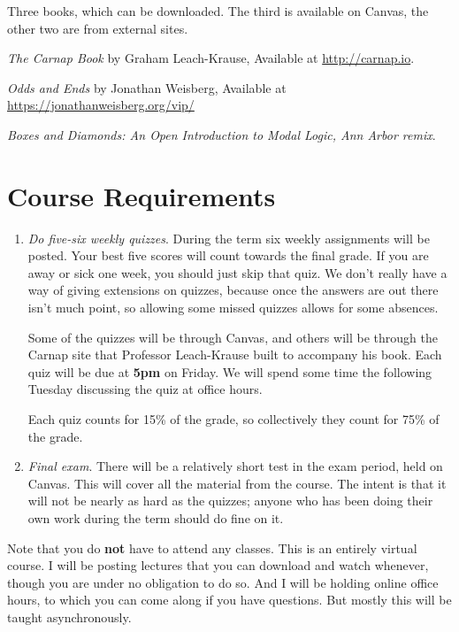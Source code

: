 \documentclass[10pt]{article}
\begin{document}
Three books, which can be downloaded. The third is available on Canvas, the other two are from external sites.

\begin{itemize*}
\item \textit{The Carnap Book} by Graham Leach-Krause, Available at \url{http://carnap.io}.
\item \textit{Odds and Ends} by Jonathan Weisberg, Available at \url{https://jonathanweisberg.org/vip/}
\item \textit{Boxes and Diamonds: An Open Introduction to Modal Logic, Ann Arbor remix}.
\end{itemize*}

\newpage

\section*{Course Requirements}

\begin{enumerate}
\item \emph{Do five-six weekly quizzes}. During the term six weekly assignments will be posted. Your best five scores will count towards the final grade. If you are away or sick one week, you should just skip that quiz. We don't really have a way of giving extensions on quizzes, because once the answers are out there isn't much point, so allowing some missed quizzes allows for some absences. \smallskip

Some of the quizzes will be through Canvas, and others will be through the Carnap site that Professor Leach-Krause built to accompany his book. Each quiz will be due at \textbf{5pm} on Friday. We will spend some time the following Tuesday discussing the quiz at office hours. \smallskip

Each quiz counts for 15\% of the grade, so collectively they count for 75\% of the grade. 

\item \emph{Final exam}. There will be a relatively short test in the exam period, held on Canvas. This will cover all the material from the course. The intent is that it will not be nearly as hard as the quizzes; anyone who has been doing their own work during the term should do fine on it.

\end{enumerate}

Note that you do \textbf{not} have to attend any classes. This is an entirely virtual course. I will be posting lectures that you can download and watch whenever, though you are under no obligation to do so. And I will be holding online office hours, to which you can come along if you have questions. But mostly this will be taught asynchronously. 
\end{document}
